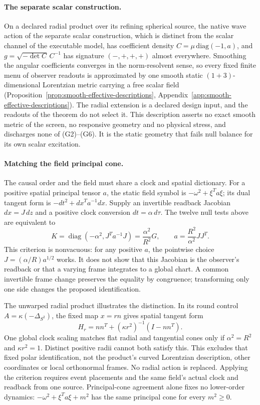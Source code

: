\documentclass[11pt]{article}
\begin{document}
\paragraph{The separate scalar construction.}
On a declared radial product over its refining spherical source, the native
wave action of the separate scalar construction, which is distinct from the
scalar channel of the executable model, has coefficient density
$C=\mu\,\mathrm{diag}(-1,a)$, and $g=\sqrt{-\det C}\,C^{-1}$ has signature
$(-,+,+,+)$ almost everywhere. Smoothing the angular coefficients converges
in the norm-resolvent sense, so every fixed finite menu of observer readouts
is approximated by one smooth static $(1+3)$-dimensional Lorentzian metric
carrying a free scalar field
(Proposition~\ref{prop:smooth-effective-descriptions},
Appendix~\ref{app:smooth-effective-descriptions}). The radial extension is a
declared design input, and the readouts of the theorem do not select it.
This description asserts no exact smooth metric of the screen, no responsive
geometry and no physical stress, and discharges none of (G2)--(G6). It is the
static geometry that fails null balance for its own scalar excitation.

\paragraph{Matching the field principal cone.}
The causal order and the field must share a clock and spatial dictionary.
For a positive spatial principal tensor $a$, the static field symbol is
$-\omega^2+\xi^Ta\xi$; its dual tangent form is
$-dt^2+dx^Ta^{-1}dx$. Supply an invertible readback Jacobian $dx=J\,dz$
and a positive clock conversion $dt=\alpha\,d\tau$. The twelve null tests
above are equivalent to
\[
 K=\operatorname{diag}(-\alpha^2,J^Ta^{-1}J)
   =\frac{\alpha^2}{R^2}G,
 \qquad a=\frac{R^2}{\alpha^2}JJ^T.
\]
This criterion is nonvacuous: for any positive $a$, the pointwise choice
$J=(\alpha/R)a^{1/2}$ works. It does not show that this Jacobian is the
observer's readback or that a varying frame integrates to a global chart.
A common invertible frame change preserves the equality by congruence;
transforming only one side changes the proposed identification.

The unwarped radial product illustrates the distinction. In its round
control $A=\kappa(-\Delta_{S^2})$, the fixed map $x=rn$ gives spatial
tangent form
\[
 H_r=nn^T+(\kappa r^2)^{-1}(I-nn^T).
\]
One global clock scaling matches flat radial and tangential cones only if
$\alpha^2=R^2$ and $\kappa r^2=1$. Distinct positive radii cannot both
satisfy this.
This excludes that fixed polar identification, not the product's curved
Lorentzian description, other coordinates or local orthonormal frames.
No radial action is replaced. Applying the criterion requires
event placements and the same field's actual clock and readback from one
source. Principal-cone agreement alone fixes no lower-order dynamics:
$-\omega^2+\xi^Ta\xi+m^2$ has the same principal cone for every
$m^2\geq0$.
\end{document}
